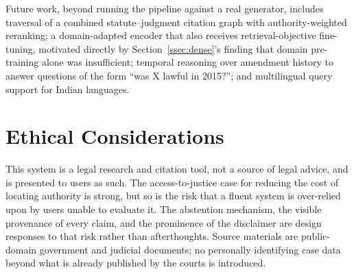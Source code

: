 \documentclass[conference]{IEEEtran}
\begin{document}
Future work, beyond running the pipeline against a real generator, includes traversal of a combined statute--judgment citation graph with authority-weighted reranking; a domain-adapted encoder that also receives retrieval-objective fine-tuning, motivated directly by Section~\ref{ssec:dense}'s finding that domain pre-training alone was insufficient; temporal reasoning over amendment history to answer questions of the form ``was X lawful in 2015?''; and multilingual query support for Indian languages.

\section*{Ethical Considerations}

This system is a legal research and citation tool, not a source of legal advice, and is presented to users as such. The access-to-justice case for reducing the cost of locating authority is strong, but so is the risk that a fluent system is over-relied upon by users unable to evaluate it. The abstention mechanism, the visible provenance of every claim, and the prominence of the disclaimer are design responses to that risk rather than afterthoughts. Source materials are public-domain government and judicial documents; no personally identifying case data beyond what is already published by the courts is introduced.
\end{document}
